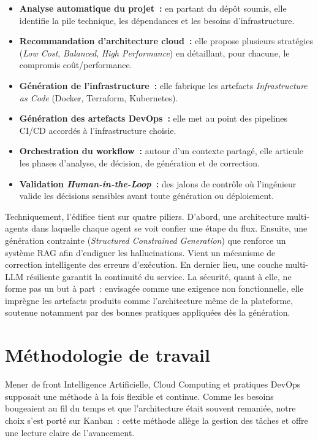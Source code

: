 \begin{itemize}
    \item \textbf{Analyse automatique du projet~:} en partant du dépôt soumis, elle identifie
    la pile technique, les dépendances et les besoins d'infrastructure.
    \item \textbf{Recommandation d'architecture cloud~:} elle propose plusieurs stratégies
    (\textit{Low Cost}, \textit{Balanced}, \textit{High Performance}) en détaillant, pour
    chacune, le compromis coût/performance.
    \item \textbf{Génération de l'infrastructure~:} elle fabrique les artefacts
    \textit{Infrastructure as Code} (Docker, Terraform, Kubernetes).
    \item \textbf{Génération des artefacts DevOps~:} elle met au point des pipelines CI/CD
    accordés à l'infrastructure choisie.
    \item \textbf{Orchestration du workflow~:} autour d'un contexte partagé, elle articule les
    phases d'analyse, de décision, de génération et de correction.
    \item \textbf{Validation \textit{Human-in-the-Loop}~:} des jalons de contrôle où
    l'ingénieur valide les décisions sensibles avant toute génération ou déploiement.
\end{itemize}

Techniquement, l'édifice tient sur quatre piliers. D'abord, une architecture multi-agents
dans laquelle chaque agent se voit confier une étape du flux. Ensuite, une génération
contrainte (\textit{Structured Constrained Generation}) que renforce un système RAG afin
d'endiguer les hallucinations. Vient un mécanisme de correction intelligente des erreurs
d'exécution. En dernier lieu, une couche multi-LLM résiliente garantit la continuité du
service. La sécurité, quant à elle, ne forme pas un but à part~: envisagée comme une exigence
non fonctionnelle, elle imprègne les artefacts produits comme l'architecture même de la
plateforme, soutenue notamment par des bonnes pratiques appliquées dès la génération.

\section{Méthodologie de travail}
Mener de front Intelligence Artificielle, Cloud Computing et pratiques DevOps supposait une
méthode à la fois flexible et continue. Comme les besoins bougeaient au fil du temps et que
l'architecture était souvent remaniée, notre choix s'est porté sur Kanban~: cette méthode
allège la gestion des tâches et offre une lecture claire de l'avancement.


